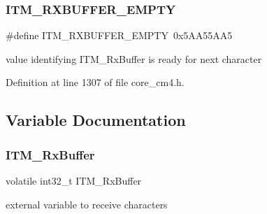 \subsubsection{\texorpdfstring{I\+T\+M\+\_\+\+R\+X\+B\+U\+F\+F\+E\+R\+\_\+\+E\+M\+P\+TY}{ITM\_RXBUFFER\_EMPTY}}
{\footnotesize\ttfamily \#define I\+T\+M\+\_\+\+R\+X\+B\+U\+F\+F\+E\+R\+\_\+\+E\+M\+P\+TY~0x5\+A\+A55\+A\+A5}

value identifying I\+T\+M\+\_\+\+Rx\+Buffer is ready for next character 

Definition at line 1307 of file core\+\_\+cm4.\+h.



\subsection{Variable Documentation}
\mbox{\label{group___c_m_s_i_s__core___debug_functions_ga12e68e55a7badc271b948d6c7230b2a8}} 
\subsubsection{\texorpdfstring{I\+T\+M\+\_\+\+Rx\+Buffer}{ITM\_RxBuffer}}
{\footnotesize\ttfamily volatile int32\+\_\+t I\+T\+M\+\_\+\+Rx\+Buffer}

external variable to receive characters 